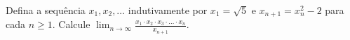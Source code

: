 Defina a sequência \(x_1, x_2, \dots\) indutivamente por \(x_1 = \sqrt{5}\) e \(x_{n+1} = x_n^2 - 2\) para cada \(n \geq 1\). Calcule
\(\lim_{n \to \infty} \frac{x_1 \cdot x_2 \cdot x_3 \cdot \dots \cdot x_n}{x_{n+1}}\).
